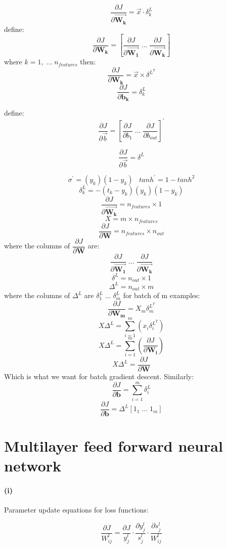 \documentclass{article}
\begin{document}
$$\dfrac{\partial{J}}{\partial{\vec{\mathbf{W_k}}}} = \vec{x}\cdot \delta_k^L$$
define:
$$\dfrac{\partial{J}}{\partial{\mathbf{W_k}}} = [ \dfrac{\partial{J}}{\partial{\vec{\mathbf{W_1}}}} \; ... \; \dfrac{\partial{J}}{\partial{\vec{\mathbf{W_k}}}}]$$
where $k = 1, \; ... \; n_{features}$ then:
$$\dfrac{\partial{J}}{\partial{\mathbf{W_k}}} = \vec{x} \times \delta ^{L^T}$$
$$\dfrac{\partial{J}}{\partial{\mathbf{b_k}}} = \delta _k ^{L}$$

define:
$$\dfrac{\partial{J}}{\partial{\vec{b}}} = {[\dfrac{\partial{J}}{\partial{b_1}} \; ... \; \dfrac{\partial{J}}{\partial{b_{out}}}]}^{'}$$

$$\dfrac{\partial{J}}{\partial{\vec{b}}} = \delta ^L$$

$$\sigma ^{'} = (y_k)(1-y_k) \; \; \; {tanh}^{'} = 1-{tanh}^2$$
$$\delta_k^{L} = -(t_k - y_k)(y_k)(1-y_k)$$
$$\dfrac{\partial{J}}{\partial{\vec{\mathbf{W_k}}}} = n_{features} \times 1$$
$$X = m \times n_{features}$$
$$\dfrac{\partial{J}}{\partial{\mathbf{W}}} = n_{features} \times n_{out}$$
where the columns of $\dfrac{\partial{J}}{\partial{\mathbf{W}}}$ are:
$$\dfrac{\partial{J}}{\partial{\vec{\mathbf{W_1}}}} \; ... \; \dfrac{\partial{J}}{\partial{\vec{\mathbf{W_k}}}}$$
$$\delta^{L} = n_{out} \times 1$$
$$\Delta ^{L} = n_{out} \times m$$
where the columns of $\Delta ^{L}$ are $\delta_1^{L} \; ... \; \delta_m^{L}$
for batch of m examples:
$$\dfrac{\partial{J}}{\partial{\mathbf{W_m}}} = X_m\delta_m^{L^T}$$
$$X \Delta ^{L}  = \sum_{i=1}^{m}(x_i \delta_i^{L^T})$$
$$X \Delta ^{L}  = \sum_{i=1}^{m}(\dfrac{\partial{J}}{\partial{\mathbf{W_i}}})$$
$$X \Delta ^{L}  = \dfrac{\partial{J}}{\partial{\mathbf{W}}}$$
Which is what we want for batch gradient descent. Similarly:
$$\dfrac{\partial{J}}{\partial{\mathbf{b}}} = \sum_{i=1}^{m}\delta_i^{L}$$
$$\dfrac{\partial{J}}{\partial{\mathbf{b}}} = \Delta ^{L}[1_1 \; ... \; 1_m]$$


\section*{Multilayer feed forward neural network}

\paragraph{(i)} Parameter update equations for loss functions:

$$\dfrac{\partial{J}}{W_{ij}^{l}} = \dfrac{\partial{J}}{y_{j}^{l}}\cdot \dfrac{\partial{y_j^{l}}}{s_{j}^{l}}\cdot\dfrac{\partial{s_j^{l}}}{W_{ij}^{l}}$$
\end{document}

